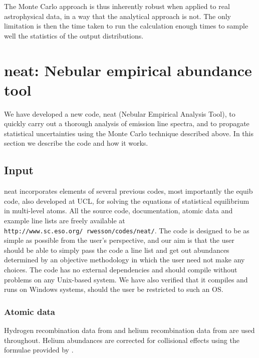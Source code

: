 \documentclass[useAMS,usenatbib]{mn2e}
\begin{document}
The Monte Carlo approach is thus inherently robust when applied to real astrophysical data, in a way that the analytical approach is not.  The only limitation is then the time taken to run the calculation enough times to sample well the statistics of the output distributions.

\section{{\sc neat}: Nebular empirical abundance tool}

We have developed a new code, {\sc neat} (Nebular Empirical Analysis Tool), to quickly carry out a thorough analysis of emission line spectra, and to propagate statistical uncertainties using the Monte Carlo technique described above.  In this section we describe the code and how it works.

\subsection{Input}

{\sc neat} incorporates elements of several previous codes, most importantly the {\sc equib} code, also developed at UCL, for solving the equations of statistical equilibrium in multi-level atoms.  All the source code, documentation, atomic data and example line lists are freely available at \texttt{http://www.sc.eso.org/~rwesson/codes/neat/}.  The code is designed to be as simple as possible from the user's perspective, and our aim is that the user should be able to simply pass the code a line list and get out abundances determined by an objective methodology in which the user need not make any choices.  The code has no external dependencies and should compile without problems on any Unix-based system.  We have also verified that it compiles and runs on Windows systems, should the user be restricted to such an OS.

\subsubsection{Atomic data}

Hydrogen recombination data from \citet{1995MNRAS.272...41S} and helium recombination data from \citet{1996MNRAS.278..683S} are used throughout.  Helium abundances are corrected for collisional effects using the formulae provided by \citet{1995ApJ...442..714K}.
\end{document}
